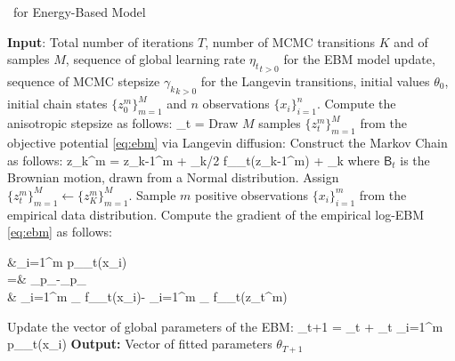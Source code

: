 \documentclass[10pt,twocolumn,letterpaper]{article}
\begin{document}
\begin{algorithm}[H]
\caption{\algo\ for Energy-Based Model} \label{alg:anila}
\begin{algorithmic}[1]
\STATE \textbf{Input}: Total number of iterations $T$, number of MCMC transitions $K$ and of samples $M$, sequence of global learning rate ${\eta_t}_{t >0}$ for the EBM model update, sequence of MCMC stepsize ${\gamma_k}_{k >0}$ for the Langevin transitions, initial values $\theta_0$, initial chain states $\{ z_{0}^m \}_{m=1}^M$ and $n$ observations $\{ x_{i} \}_{i=1}^n$.
\STATE Compute the anisotropic stepsize as follows: \label{line:step}
\beq\label{eq:step}
\stepsize_t = 
\eeq
\STATE Draw $M$ samples $\{ z_{t}^m \}_{m=1}^M$ from the objective potential \eqref{eq:ebm} via Langevin diffusion:\label{line:langevin}
\STATE Construct the Markov Chain as follows:
\beq\label{eq:anila}
z_{k}^{m} = z_{k-1}^m + \stepsize_k/2  \nabla f_{\theta_t}(z_{k-1}^m) +  _k
\eeq
where $\mathsf{B}_t$ is the Brownian motion, drawn from a Normal distribution.
\ENDFOR
\STATE Assign $\{ z_{t}^m \}_{m=1}^M \leftarrow \{ z_{K}^m \}_{m=1}^M$.
\STATE Sample $m$ positive observations $\{ x_{i} \}_{i=1}^m$ from the empirical data distribution.
\STATE Compute the gradient of the empirical log-EBM \eqref{eq:ebm} as follows:
\beq\notag
\begin{split}
&\nabla \sum_{i=1}^m \log p_{\theta_t}(x_i) \\
 =& _{p_{}}-_{p_{\theta}}\\
 \approx &  \sum_{i=1}^{m} \nabla_{\theta} f_{\theta_t}\left(x_{i}\right)- \sum_{i=1}^{m} \nabla_{\theta} f_{\theta_t}\left(z_t^m\right)
\end{split}
\eeq
\STATE Update the vector of global parameters of the EBM:\label{line:gradient}
\beq\notag
\theta_{t+1} = \theta_{t} + \eta_t \nabla \sum_{i=1}^m \log p_{\theta_t}(x_i)
\eeq
\ENDFOR
\STATE \textbf{Output:} Vector of fitted parameters $\theta_{T+1}$
\end{algorithmic}
\end{algorithm}
\end{document}
